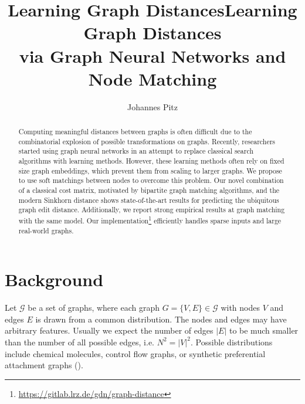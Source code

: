 \documentclass[a4paper,10pt]{article}
\title{Learning Graph Distances} %
\author{Johannes Pitz} %
\institute{\textit{Guided Research: Data Analytics and Machine Learning Group  \protect\\ TUM Department of Informatics}}
\begin{document}
\title{Learning Graph Distances \protect\\ via Graph Neural Networks and Node Matching}
\maketitle

\begin{abstract}


Computing meaningful distances between graphs is often difficult due to the combinatorial explosion of possible transformations on graphs. Recently, researchers started using graph neural networks in an attempt to replace classical search algorithms with learning methods. However, these learning methods often rely on fixed size graph embeddings, which prevent them from scaling to larger graphs. We propose to use soft matchings between nodes to overcome this problem. Our novel combination of a classical cost matrix, motivated by bipartite graph matching algorithms, and the modern Sinkhorn distance shows state-of-the-art results for predicting the ubiquitous graph edit distance. Additionally, we report strong empirical results at graph matching with the same model. Our implementation\footnote{\url{https://gitlab.lrz.de/gdn/graph-distance}} efficiently handles sparse inputs and large real-world graphs.






\end{abstract}



\section{Background}

Let $\mathcal{G}$ be a set of graphs, where each graph $G = \{V, E\} \in \mathcal{G}$ with nodes $V$ and edges $E$ is drawn from a common distribution. The nodes and edges may have arbitrary features. Usually we expect the number of edges $\vert E \vert$ to be much smaller than the number of all possible edges, i.e. $N^2 = \vert V \vert ^2$. Possible distributions include chemical molecules, control flow graphs, or synthetic preferential attachment graphs (\citealp{pref_att2002}).
\end{document}

